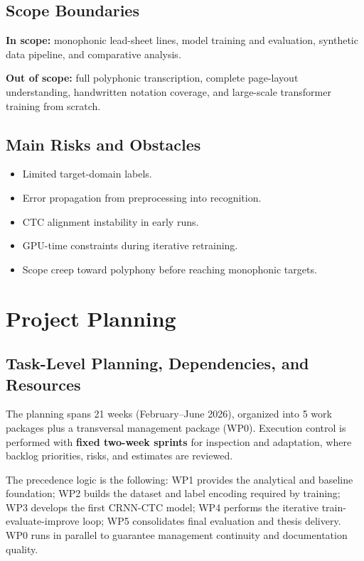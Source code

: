 \documentclass[11pt, a4paper]{article}
\begin{document}
\subsection{Scope Boundaries}
\textbf{In scope:} monophonic lead-sheet lines, model training and evaluation, synthetic data pipeline, and comparative analysis.

\textbf{Out of scope:} full polyphonic transcription, complete page-layout understanding, handwritten notation coverage, and large-scale transformer training from scratch.

\subsection{Main Risks and Obstacles}
\begin{itemize}
    \item Limited target-domain labels.
    \item Error propagation from preprocessing into recognition.
    \item CTC alignment instability in early runs.
    \item GPU-time constraints during iterative retraining.
    \item Scope creep toward polyphony before reaching monophonic targets.
\end{itemize}

\section{Project Planning}
\label{sec:planning}

\subsection{Task-Level Planning, Dependencies, and Resources}
The planning spans 21 weeks (February--June 2026), organized into 5 work packages plus a transversal management package (WP0). Execution control is performed with \textbf{fixed two-week sprints} for inspection and adaptation, where backlog priorities, risks, and estimates are reviewed.

The precedence logic is the following: WP1 provides the analytical and baseline foundation; WP2 builds the dataset and label encoding required by training; WP3 develops the first CRNN-CTC model; WP4 performs the iterative train-evaluate-improve loop; WP5 consolidates final evaluation and thesis delivery. WP0 runs in parallel to guarantee management continuity and documentation quality.
\end{document}

